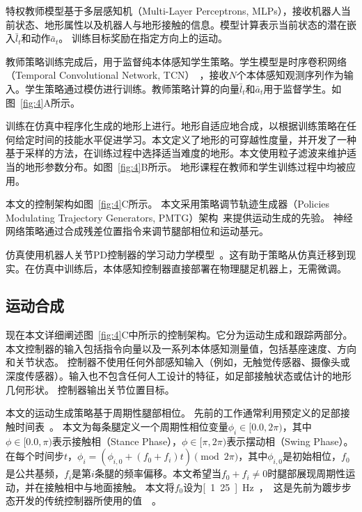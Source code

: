 \documentclass[9pt,twocolumn,twoside]{osajnl}
\begin{document}
特权教师模型基于多层感知机（Multi-Layer Perceptrons, MLPs），接收机器人当前状态、地形属性以及机器人与地形接触的信息。模型计算表示当前状态的潜在嵌入$\bar{l}_t$和动作$\bar{a}_t$。
训练目标奖励在指定方向上的运动。

教师策略训练完成后，用于监督纯本体感知学生策略。学生模型是时序卷积网络（Temporal Convolutional Network, TCN）~\cite{bai2018empirical}，接收$N$个本体感知观测序列作为输入。学生策略通过模仿进行训练。教师策略计算的向量$\bar{l}_t$和$\bar{a}_t$用于监督学生。如图~\ref{fig:4}A所示。

训练在仿真中程序化生成的地形上进行。地形自适应地合成，以根据训练策略在任何给定时间的技能水平促进学习。本文定义了地形的可穿越性度量，并开发了一种基于采样的方法，在训练过程中选择适当难度的地形。本文使用粒子滤波来维护适当的地形参数分布。如图~\ref{fig:4}B所示。
地形课程在教师和学生训练过程中均被应用。

本文的控制架构如图~\ref{fig:4}C所示。
本文采用策略调节轨迹生成器（Policies Modulating Trajectory Generators, PMTG）架构~\cite{iscen2018policies}来提供运动生成的先验。
神经网络策略通过合成残差位置指令来调节腿部相位和运动基元。

仿真使用机器人关节PD控制器的学习动力学模型~\cite{hwangbo2019learning}。这有助于策略从仿真迁移到现实。在仿真中训练后，本体感知控制器直接部署在物理腿足机器上，无需微调。

\subsection*{运动合成}

现在本文详细阐述图~\ref{fig:4}C中所示的控制架构。它分为运动生成和跟踪两部分。
本文控制器的输入包括指令向量以及一系列本体感知测量值，包括基座速度、方向和关节状态。
控制器不使用任何外部感知输入（例如，无触觉传感器、摄像头或深度传感器）。输入也不包含任何人工设计的特征，如足部接触状态或估计的地形几何形状。
控制器输出关节位置目标。

本文的运动生成策略基于周期性腿部相位。
先前的工作通常利用预定义的足部接触时间表~\cite{barasuol2013reactive,bledt2018contact,bellicoso2018dynamic}。
本文为每条腿定义一个周期性相位变量$\phi_{i} \in [0.0, 2\pi)$，其中$\phi \in [0.0, \pi)$表示接触相（Stance Phase），$\phi \in [\pi, 2\pi)$表示摆动相（Swing Phase）。
在每个时间步$t$，$\phi_i = (\phi_{i,0} + (f_0 + f_i)t ) \pmod{2 \pi}$，其中$\phi_{i,0}$是初始相位，$f_0$是公共基频，$f_i$是第$i$条腿的频率偏移。本文希望当$f_0+f_i \neq 0$时腿部展现周期性运动，并在接触相中与地面接触。
本文将$f_0$设为\unit[1.25]{Hz}，这是先前为踱步步态开发的传统控制器所使用的值~\cite{bellicoso2018dynamic}。
\end{document}
